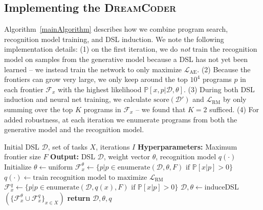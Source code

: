 \documentclass{article}
\newcommand{\system}{\textsc{DreamCoder}~}
\newcommand{\probability}{\mathds{P}} %
\begin{document}
\subsection{Implementing the \system}

Algorithm~\ref{mainAlgorithm} describes how we combine program search,
recognition model training, and DSL induction.
We note the following implementation details:
(1) on the first iteration, we do \emph{not} train the recognition model on samples from
the generative model because a DSL has not yet been learned --
we instead train the network to only maximize $\mathcal{L}_{\text{AE}}$.
(2) Because the frontiers can grow very large,
we only keep around the top $10^4$ programs $p$ in each frontier $\mathcal{F}_x$
with the highest likelihood $\probability[x,p|\mathcal{D},\theta]$.
(3) During both DSL induction and neural net training, we calculate $\text{score}(\mathcal{D}')$ and $\mathcal{L}_{\text{RM}}$
by only summing over the top $K$
programs in $\mathcal{F}_x$ -- we found that $K = 2$ sufficed.
(4) For added robustness, at each iteration we enumerate programs from both the generative model and the recognition model.

\begin{algorithm}[tb]
   \caption{The \system Algorithm}
   \label{mainAlgorithm}
   \begin{algorithmic}
      Initial DSL $\mathcal{D}$, set of tasks $X$, iterations $I$
     \STATE \textbf{Hyperparameters:} Maximum frontier size $F$
     \STATE \textbf{Output:} DSL $\mathcal{D}$, weight vector $\theta$, recognition model $q(\cdot)$
     \STATE Initialize $\theta\gets \text{uniform}$ %
     \STATE  $\mathcal{F}^{\theta}_x\gets \{p| p\in \text{enumerate}(\mathcal{D},\theta,F)\text{ if }\probability[x|p] > 0\}$
     \STATE $q(\cdot )\gets \text{train recognition model to maximize }\mathcal{L}_{\text{RM}}$
     \STATE  $\mathcal{F}^{q}_x\gets\{p|p\in \text{enumerate}(\mathcal{D},q(x),F)\text{ if }\probability[x|p] > 0\}$
     \STATE $\mathcal{D},\theta\gets $induceDSL$(\{\mathcal{F}^{\theta}_x\cup\mathcal{F}^{q}_x\}_{x\in X})$
      \ENDFOR
 \STATE \textbf{return} $\mathcal{D},\theta,q$
\end{algorithmic}
\end{algorithm}
\end{document}
